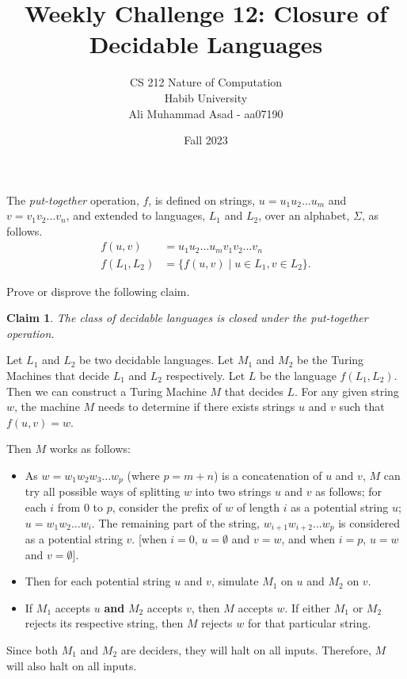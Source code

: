 \documentclass[a4paper]{exam}
\title{Weekly Challenge 12: Closure of Decidable Languages}
\author{CS 212 Nature of Computation\\Habib University\\Ali Muhammad Asad - aa07190}
\date{Fall 2023}
\newtheorem{claim}{Claim}
\begin{document}
\maketitle

\begin{questions}


  The \textit{put-together} operation, $f$, is defined on strings, $u=u_1u_2\ldots u_m$ and $v=v_1v_2\ldots v_n$, and extended to languages, $L_1$ and $L_2$, over an alphabet, $\Sigma$, as follows.
  \begin{align*}
    f(u,v)      & = u_1u_2\ldots u_mv_1v_2\ldots v_n      \\
    f(L_1, L_2) & = \{ f(u,v) \mid u\in L_1, v\in L_2 \}.
  \end{align*}

  Prove or disprove the following claim.
  \begin{claim}
    The class of decidable languages is closed under the put-together operation.
  \end{claim}

  \begin{solution}
    Let $L_1$ and $L_2$ be two decidable languages. Let $M_1$ and $M_2$ be the Turing Machines that decide $L_1$ and $L_2$ respectively. Let $L$ be the language $ f(L_1, L_2) $. Then we can construct a Turing Machine $M$ that decides $L$. For any given string $w$, the machine $M$ needs to determine if there exists strings $u$ and $v$ such that $f(u,v) = w$.

    Then $M$ works as follows: \vspace*{-2mm} \begin{itemize}
      \item As $w = w_1 w_2 w_3 ... w_p $ (where $p = m + n$) is a concatenation of $u$ and $v$, $M$ can try all possible ways of splitting $w$ into two strings $u$ and $v$ as follows; for each $i$ from 0 to $p$, consider the prefix of $w$ of length $i$ as a potential string $u$; $u = w_1 w_2 ... w_i$. The remaining part of the string, $ w_{i + 1} w_{i + 2} ... w_p $ is considered as a potential string $v$. [when $i = 0$, $ u = \emptyset $ and $v = w$, and when $ i = p $, $ u = w $ and $v = \emptyset$]. \vspace*{-2mm}
      \item Then for each potential string $u$ and $v$, simulate $M_1$ on $u$ and $M_2$ on $v$. \vspace*{-2mm}
      \item If $M_1$ accepts $u$ \textbf{and} $M_2$ accepts $v$, then $M$ accepts $w$. If either $M_1$ or $M_2$ rejects its respective string, then $M$ rejects $w$ for that particular string.
    \end{itemize} \vspace*{-2mm}
    Since both $M_1$ and $M_2$ are deciders, they will halt on all inputs. Therefore, $M$ will also halt on all inputs.


\end{solution}
\end{questions}
\end{document}
